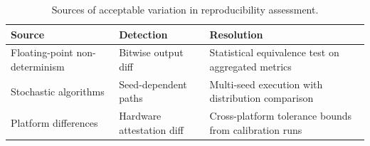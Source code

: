 \begin{table}[H]
\centering
\caption{Sources of acceptable variation in reproducibility assessment.}
\label{tab:variation}
\begin{tabularx}{\textwidth}{@{}llX@{}}
\toprule
\textbf{Source} & \textbf{Detection} & \textbf{Resolution} \\
\midrule
Floating-point non-determinism & Bitwise output diff & Statistical equivalence test on aggregated metrics \\
Stochastic algorithms & Seed-dependent paths & Multi-seed execution with distribution comparison \\
Platform differences & Hardware attestation diff & Cross-platform tolerance bounds from calibration runs \\
\bottomrule
\end{tabularx}
\end{table}

